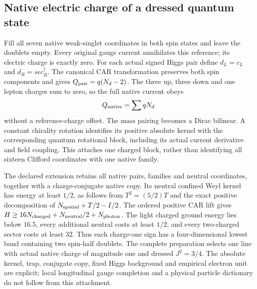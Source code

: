 \subsection{Native electric charge of a dressed quantum state}
Fill all seven native weak-singlet coordinates in both spin states and
leave the doublets empty. Every original gauge current annihilates this
reference; its electric charge is exactly zero. For each actual signed
Higgs pair define $d_L=c_L$ and $d_R=s\epsilon c_R^\dagger$. The canonical
CAR transformation preserves both spin components and gives
$Q_{\rm pair}=q(N_d-2)$. The three up, three down and one lepton charges
sum to zero, so the full native current obeys
\[
 Q_{\rm native}=\sum qN_d
\]
without a reference-charge offset. The mass pairing becomes a Dirac
bilinear. A constant chirality rotation identifies its positive absolute
kernel with the corresponding quantum rotational block, including its
actual current derivative and field coupling. This attaches one charged
block, rather than identifying all sixteen Clifford coordinates with one
native family.

The declared extension retains all native pairs, families and neutral
coordinates, together with a charge-conjugate native copy. Its neutral
confined Weyl kernel has energy at least $1/2$, as follows from
$T^2=(5/2)T$ and the exact positive decomposition of
$N_{\rm spatial}+T/2-I/2$. The ordered positive CAR lift gives
$H\ge16N_{\rm charged}+N_{\rm neutral}/2+N_{\rm photon}$.
The light charged ground energy lies below $16.5$, every additional neutral
costs at least $1/2$, and every two-charged sector costs at least $32$.
Thus each charge-one sign has a four-dimensional lowest band containing
two spin-half doublets. The complete preparation selects one line with
actual native charge of magnitude one and dressed $J^2=3/4$.
The absolute kernel, trap, conjugate copy, fixed Higgs background and
empirical electron unit are explicit; local longitudinal gauge completion
and a physical particle dictionary do not follow from this attachment.
